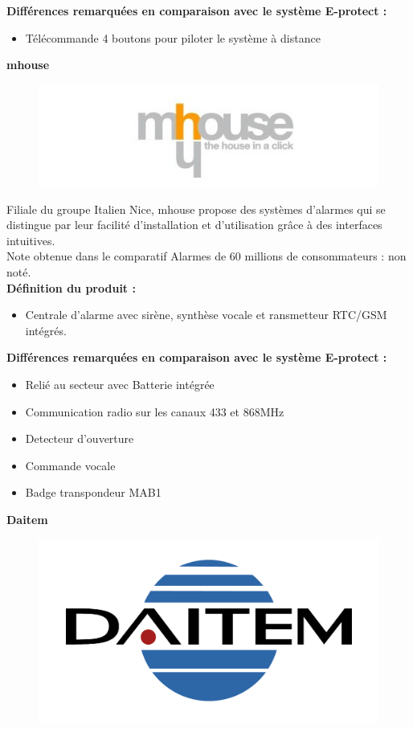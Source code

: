 \textbf{Différences remarquées en comparaison avec le système E-protect :}
\begin{itemize}
\item Télécommande 4 boutons pour piloter le système à distance\\
\end{itemize}

\textbf{mhouse}\\
\begin{figure}[h!]
	\begin{center}
		\includegraphics[width=0.4\linewidth]{../images/mhouse}
	\end{center}
	\caption{\cite{www:mhouse}}
\end{figure}

Filiale du groupe Italien Nice, mhouse propose des systèmes d'alarmes qui se distingue par leur facilité d'installation et d'utilisation grâce à des interfaces intuitives.\\
Note obtenue dans le comparatif Alarmes de 60 millions de consommateurs : non noté.\\

\textbf{Définition du produit :}
\begin{itemize}
\item Centrale d'alarme avec sirène, synthèse vocale et ransmetteur RTC/GSM intégrés.
\end{itemize}

\textbf{Différences remarquées en comparaison avec le système E-protect :}
\begin{itemize}
\item Relié au secteur avec Batterie intégrée 
\item Communication radio sur les canaux 433 et 868MHz
\item Detecteur d'ouverture
\item Commande vocale
\item Badge transpondeur MAB1\\
\end{itemize}

\textbf{Daitem}\\
\begin{figure}[h!]
	\begin{center}
		\includegraphics[width=0.4\linewidth]{../images/daitem}
	\end{center}
	\caption{\cite{www:daitem}}
\end{figure}


